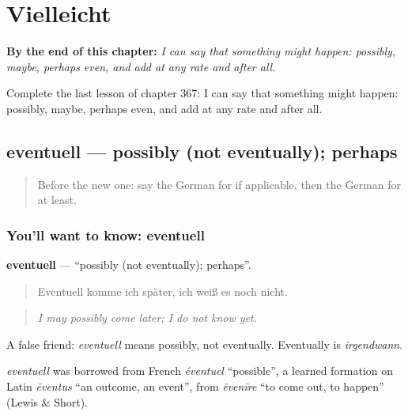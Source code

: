 
\chapter{Vielleicht}
\label{ch:ge-vielleicht}

\begin{chapteropening}
\textbf{By the end of this chapter:} \emph{I can say that something might happen: possibly, maybe, perhaps even, and add at any rate and after all.}

Complete the last lesson of chapter 367: I can say that something might happen: possibly, maybe, perhaps even, and add at any rate and after all.
\end{chapteropening}

\section[eventuell]{eventuell — possibly (not eventually); perhaps}

\label{lesson:GE-C367-eventuell}



\begin{quote}
Before the new one: say the German for if applicable, then the German for at least.
\end{quote}

\subsection*{You'll want to know: eventuell}
\textbf{eventuell} — \textquotedblleft{}possibly (not eventually); perhaps\textquotedblright{}.

\begin{quote}
Eventuell komme ich später, ich weiß es noch nicht.
\end{quote}

\begin{quote}
\emph{I may possibly come later; I do not know yet.}
\end{quote}

A false friend: \emph{eventuell} means possibly, not eventually. Eventually is \emph{irgendwann}.

\begin{cousinweb}
\emph{eventuell} was borrowed from French \emph{éventuel} \textquotedblleft{}possible\textquotedblright{}, a learned formation on Latin \emph{ēventus} \textquotedblleft{}an outcome, an event\textquotedblright{}, from \emph{ēvenīre} \textquotedblleft{}to come out, to happen\textquotedblright{} (Lewis \& Short).
\end{cousinweb}

